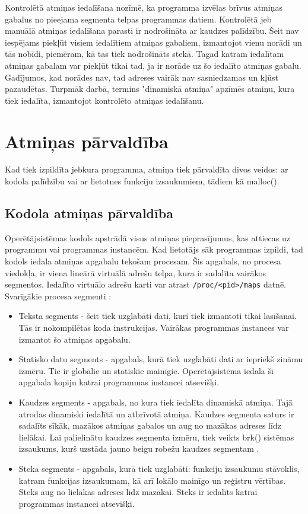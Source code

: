 Kontrolētā atmiņas iedalīšana nozīmē, ka programma izvēlas brīvus atmiņas gabalus no pieejama segmenta telpas programmas datiem. 
Kontrolētā jeb manuālā atmiņas iedalīšana parasti ir nodrošināta ar kaudzes palīdzību.
Šeit nav iespējams piekļūt visiem iedalītiem atmiņas gabaliem, izmantojot vienu norādi un tās nobīdi, piemēram, kā tas tiek nodrošināts stekā. 
Tagad katram iedalītam atmiņas gabalam var piekļūt tikai tad, ja ir norāde uz šo iedalīto atmiņas gabalu. 
Gadījumos, kad norādes nav, tad adreses vairāk nav sasniedzamas un kļūst pazaudētas.
Turpmāk darbā, termins "dinamiskā atmiņa" apzīmēs atmiņu, kura tiek iedalīta, izmantojot kontrolēto atmiņas iedalīšanu.


\section{Atmiņas pārvaldība}
Kad tiek izpildīta jebkura programma, atmiņa tiek pārvaldīta divos veidos: ar kodola palīdzību vai ar lietotnes funkciju izsaukumiem, tādiem kā malloc().

\subsection{Kodola atmiņas pārvaldība}
Operētājsistēmas kodols apstrādā visus atmiņas pieprasījumus, kas attiecas uz programmu vai programmas instancēm.
Kad lietotājs sāk programmas izpildi, tad kodols iedala atmiņas apgabalu tekošam procesam.
Šis apgabals, no procesa viedokļa, ir viena lineārā virtuālā adrešu telpa, kura ir sadalīta vairākos segmentos.
Iedalīto virtuālo adrešu karti var atrast \texttt{/proc/<pid>/maps} datnē.
Svarīgākie procesa segmenti  \cite {PETRSOF}:
\begin{itemize}
	\item   Teksta segments - šeit tiek uzglabāti dati, kuri tiek izmantoti tikai lasīšanai. Tās ir nokompilētas koda instrukcijas. 
    Vairākas programmas instances var izmantot šo atmiņas apgabalu.
    \item Statisko datu segments - apgabals, kurā tiek uzglabāti dati ar iepriekš zināmu izmēru. Tie ir globālie un statiskie mainīgie.
    Operētājsistēma iedala šī apgabala kopiju katrai programmas instancei atsevišķi.
    \item Kaudzes segments - apgabals, no kura tiek iedalīta dinamiskā atmiņa.
    Tajā atrodas dinamiski iedalītā un atbrīvotā atmiņa. Kaudzes segmenta saturs ir sadalīts sīkāk, mazākos atmiņas gabalos un aug no mazākas adreses līdz lielākai.  Lai palielinātu kaudzes segmenta izmēru, tiek veikts brk() sistēmas izsaukums, kurš uzstāda jauno beigu robežu kaudzes segmentam \cite{LINMAN}. 
    \item Steka segments - apgabals, kurā tiek uzglabāti: funkciju izsaukumu stāvoklis, katram funkcijas izsaukumam, kā arī lokālo mainīgo un reģistru vērtības. 
    Steks aug no lielākas adreses līdz mazākai. 
    Steks ir iedalīts katrai programmas instancei atsevišķi.
\end{itemize} 

